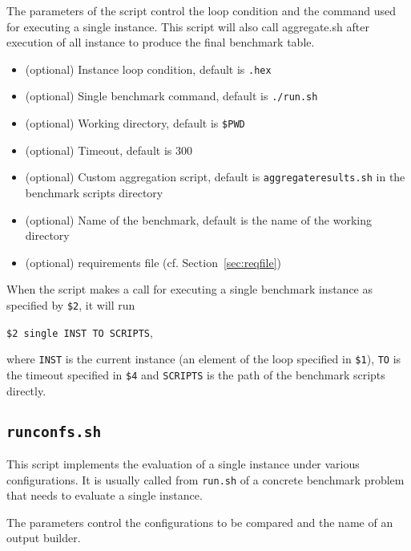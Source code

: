 \documentclass[a4paper]{article}
\begin{document}
		    The parameters of the script control the loop condition
		    and the command used for executing a single instance.
		    This script will also call aggregate.sh after execution of all instance
		    to produce the final benchmark table.
				
		    \medskip{}
		    \begin{itemize}
				\item[{\tt \$1}:] (optional) Instance loop condition, default is {\tt *.hex}
				\item[{\tt \$2}:] (optional) Single benchmark command, default is {\tt ./run.sh}
				\item[{\tt \$3}:] (optional) Working directory, default is {\tt \$PWD}
				\item[{\tt \$4}:] (optional) Timeout, default is {\tt $300$}
				\item[{\tt \$5}:] (optional) Custom aggregation script, default is {\tt aggregateresults.sh}
					in the benchmark scripts directory
				\item[{\tt \$6}:] (optional) Name of the benchmark, default is the name of the working directory
				\item[{\tt \$7}:] (optional) requirements file (cf. Section~\ref{sec:reqfile})
		    \end{itemize}
		 
		 	When the script makes a call for executing a single benchmark instance
		 	as specified by {\tt \$2}, it will run
		 	\begin{center}
		 		{\tt \$2 single INST TO SCRIPTS},
		 	\end{center}
		 	where {\tt INST} is the current instance (an element of the loop specified in {\tt \$1}),
		 	{\tt TO} is the timeout specified in {\tt \$4}
		 	and {\tt SCRIPTS} is the path of the benchmark scripts directly.
				
		\subsection{\tt runconfs.sh}
		
		    This script implements the evaluation of
		    a single instance under various configurations.
		    It is usually called from {\tt run.sh} of a concrete benchmark problem
		    that needs to evaluate a single instance.
		
		    The parameters control the configurations to be compared
		    and the name of an output builder.
		
\end{document}
